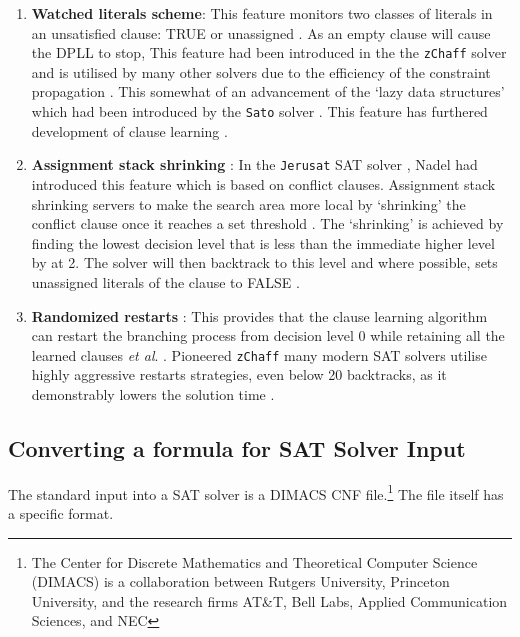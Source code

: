 \documentclass[11pt, a4paper, oneside]{report} %
\begin{document}
\begin{enumerate}
  \item \textbf{Watched literals scheme}:  This feature monitors two classes of
literals in an unsatisfied clause: TRUE or unassigned \cite{moskewicz2001chaff}.
As an empty clause will cause the DPLL to stop, This feature had been introduced
in the the \texttt{zChaff} solver and is utilised by many other solvers due to
the efficiency of the constraint propagation \cite{gomes2008satisfiability}.
This somewhat of an advancement of the `lazy data structures' which had been
introduced by the \texttt{Sato} solver \cite{zhang1997sato}. This feature has
furthered development of clause learning
\cite{zhang2002quest,gomes2008satisfiability}.


  \item \textbf{Assignment stack shrinking} : In the \texttt{Jerusat} SAT solver
\cite{nadel2002jerusat}, Nadel had introduced this feature which is based on
conflict clauses. Assignment stack shrinking servers to make the search area
more local by `shrinking' the conflict clause once it reaches a set threshold
\cite{Nadel:2010:ASS:2164073.2164111}. The `shrinking' is achieved by finding
the lowest decision level that is less than the immediate higher level by at 2.
The solver will then backtrack to this level and where possible, sets unassigned
literals of the clause to FALSE \cite{Nadel:2010:ASS:2164073.2164111}.


  \item \textbf{Randomized restarts} : This provides that the clause learning
algorithm can restart   the branching process from decision level 0 while
retaining all the learned clauses \textit{et   al}. \cite{gomes1998boosting}.
Pioneered \texttt{zChaff} \cite{moskewicz2001chaff} many modern   SAT solvers
utilise highly aggressive restarts strategies, even below 20 backtracks, as it
demonstrably lowers the solution time \cite{gomes2008satisfiability}.

\end{enumerate}

\subsection{Converting a formula for SAT Solver Input}

The standard input into a SAT solver is a DIMACS CNF file.\footnote{The Center
for Discrete Mathematics and Theoretical Computer Science (DIMACS) is a
collaboration between Rutgers University, Princeton University, and the research
firms AT&T, Bell Labs, Applied Communication Sciences, and NEC} The file itself
has a specific format.
\end{document}
